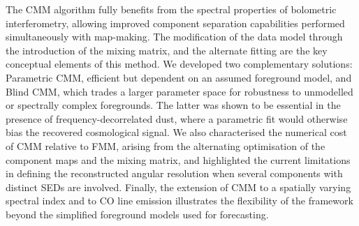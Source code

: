\documentclass[../../thesis.tex]{subfiles}
\begin{document}
The CMM algorithm fully benefits from the spectral properties of bolometric interferometry, allowing improved component separation capabilities performed simultaneously with map-making. The modification of the data model through the introduction of the mixing matrix, and the alternate fitting are the key conceptual elements of this method. We developed two complementary solutions: Parametric CMM, efficient but dependent on an assumed foreground model, and Blind CMM, which trades a larger parameter space for robustness to unmodelled or spectrally complex foregrounds. The latter was shown to be essential in the presence of frequency-decorrelated dust, where a parametric fit would otherwise bias the recovered cosmological signal. We also characterised the numerical cost of CMM relative to FMM, arising from the alternating optimisation of the component maps and the mixing matrix, and highlighted the current limitations in defining the reconstructed angular resolution when several components with distinct SEDs are involved. Finally, the extension of CMM to a spatially varying spectral index and to CO line emission illustrates the flexibility of the framework beyond the simplified foreground models used for forecasting. 
\end{document}
